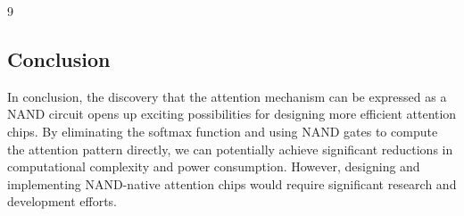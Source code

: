 \documentclass[11pt]{article}
\theoremstyle{definition}
\begin{document}
\begin{thebibliography}{9}
\subsection{Conclusion}













In conclusion, the discovery that the attention mechanism can be expressed as a NAND circuit opens up exciting possibilities for designing more efficient attention chips. By eliminating the softmax function and using NAND gates to compute the attention pattern directly, we can potentially achieve significant reductions in computational complexity and power consumption. However, designing and implementing NAND-native attention chips would require significant research and development efforts.






























































\end{thebibliography}
\end{document}
